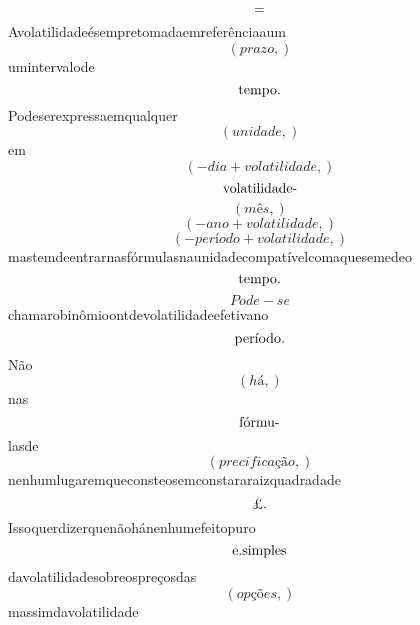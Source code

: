 \documentclass{article}
\begin{document}
\begin{equation}
$=$
\end{equation}Avolatilidadeésempretomadaemreferênciaaum\begin{equation}
\left( prazo,\right)
\end{equation}umintervalode\begin{equation}
$tempo.$
\end{equation}Podeserexpressaemqualquer\begin{equation}
\left( unidade,\right)
\end{equation}em\begin{equation}
\left( - dia + volatilidade,\right)
\end{equation}\begin{equation}
$volatilidade-$
\end{equation}\begin{equation}
\left( mês,\right)
\end{equation}\begin{equation}
\left( - ano + volatilidade,\right)
\end{equation}\begin{equation}
\left( - período + volatilidade,\right)
\end{equation}mastemdeentrarnasfórmulasnaunidadecompatívelcomaquesemedeo\begin{equation}
$tempo.$
\end{equation}\begin{equation}
Pode - se
\end{equation}chamarobinômioontdevolatilidadeefetivano\begin{equation}
$período.$
\end{equation}Não\begin{equation}
\left( há,\right)
\end{equation}nas\begin{equation}
$fórmu-$
\end{equation}lasde\begin{equation}
\left( precificação,\right)
\end{equation}nenhumlugaremqueconsteosemconstararaizquadradade\begin{equation}
$£.$
\end{equation}Issoquerdizerquenãohánenhumefeitopuro\begin{equation}
$e.simples$
\end{equation}davolatilidadesobreospreçosdas\begin{equation}
\left( opções,\right)
\end{equation}massimdavolatilidade\begin{equation}

\end{equation}
\end{document}
